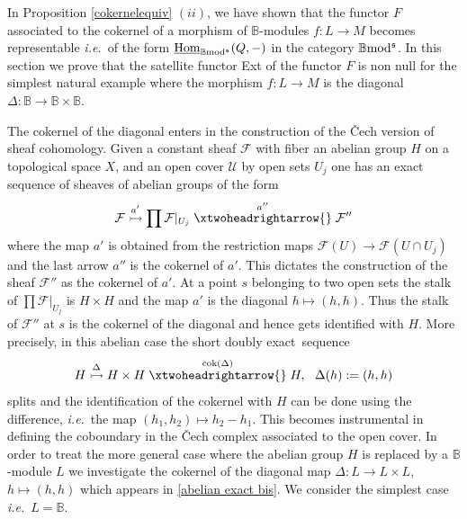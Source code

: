 \documentclass[12pt]{article}
\def\Homi{{\underline{\rm Hom}}}
\def\scoker{{\rm cok}}
\def\B{{\mathbb B}}
\def\exxx{{doubly exact}~}
\def\cF{{\mathcal F}}
\def\cU{{\mathcal U}}
\newcommand{\ie}{{\it i.e.\/}\ }
\def\b2{{\rm \B mod^{\mathfrak s}}}
\begin{document}
 In Proposition \ref{cokernelequiv} $(ii)$, we have shown  that the functor $F$ associated to the  cokernel of a morphism of $\B$-modules $f:L\to M$ becomes representable \ie of the form $\Homi_\b2(Q,-)$ in the category $\b2$. 
 In this section we prove that the satellite functor Ext of the functor $F$ is non null for the simplest natural example where the morphism $f:L\to M$ is the diagonal $\Delta: \B\to \B\times \B$. 
  
  The cokernel of the diagonal enters in the construction of the \v Cech version of sheaf cohomology. Given a constant sheaf $\cF$ with fiber an abelian group $H$ on a topological space $X$, and an open cover $\cU$ by open sets $U_j$ one has an exact sequence of sheaves of abelian groups of the form
\begin{equation}\label{abelian exact}
	\cF\stackrel{a'}{\rightarrowtail} \prod \cF\vert_{U_j}\stackrel{a''}{\xtwoheadrightarrow{}}\cF''
\end{equation}
where the map $a'$ is obtained from the restriction maps $\cF(U)\to \cF(U\cap U_j)$ and  the last arrow $a''$ is the cokernel of $a'$. This dictates the construction of the sheaf $\cF''$ as the cokernel of $a'$. At a point $s$ belonging to two open sets the stalk of $\prod \cF\vert_{U_j}$  is $H\times H$ and the map $a'$ is the diagonal $h\mapsto (h,h)$. Thus the stalk of $\cF''$ at $s$ is the cokernel of the diagonal and hence gets identified with  $H$. More precisely, in this abelian case the short \exxx sequence 
\begin{equation}\label{abelian exact bis}
	H\stackrel{\Delta}{\rightarrowtail} H\times H\stackrel{\scoker(\Delta)}{\xtwoheadrightarrow{}}H, \  \ \Delta(h):=(h,h)
\end{equation}
splits and  the identification of the cokernel with $H$ can be done using the difference, \ie the map $(h_1,h_2)\mapsto h_2-h_1$. This becomes instrumental in defining the coboundary in the \v Cech complex associated to the open cover.
In order to treat the more general case where the abelian group $H$ is replaced by a $\B$-module $L$ we  investigate the cokernel of the diagonal map $\Delta:L\to L\times L$, $h\mapsto (h,h)$  which appears in \eqref{abelian exact bis}. We consider the simplest case \ie $L=\B$. \vspace{.05in}
\end{document}
